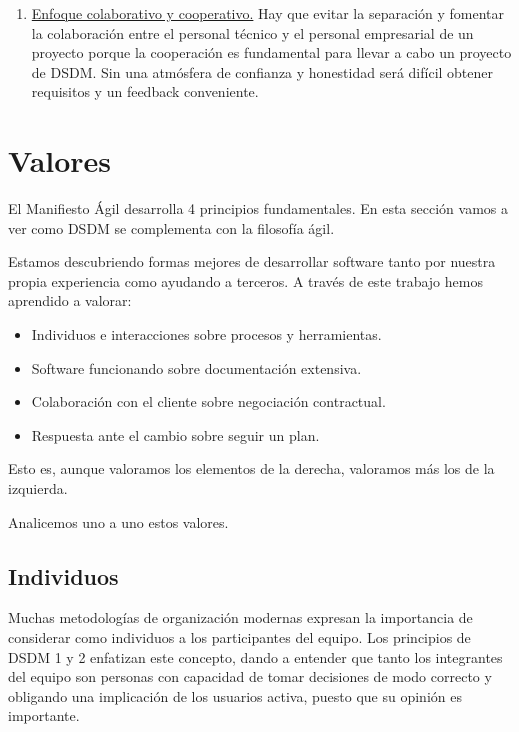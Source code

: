 \documentclass[12pt,a4paper]{article}
\begin{document}
\begin{enumerate}
\item \underline{Enfoque colaborativo y cooperativo.} Hay que evitar la separación y fomentar la colaboración entre el personal técnico y el personal empresarial
de un proyecto porque la cooperación es fundamental para llevar a cabo un proyecto de DSDM. Sin una atmósfera de confianza y honestidad será difícil obtener requisitos y un feedback conveniente.
\end{enumerate}

\section{Valores}

El Manifiesto Ágil desarrolla 4 principios fundamentales. En esta sección vamos a ver como DSDM se complementa con la filosofía ágil.

\begin{myboxii}

Estamos descubriendo formas mejores de desarrollar software tanto por nuestra propia experiencia como ayudando a terceros. A través de este trabajo hemos aprendido a valorar:

    \begin{itemize}
    \item Individuos e interacciones sobre procesos y herramientas.
    \item Software funcionando sobre documentación extensiva.
    \item Colaboración con el cliente sobre negociación contractual.
    \item Respuesta ante el cambio sobre seguir un plan.
    \end{itemize}

Esto es, aunque valoramos los elementos de la derecha, valoramos más los de la izquierda.
\end{myboxii}

Analicemos uno a uno estos valores.

\subsection{Individuos}

Muchas metodologías de organización modernas expresan la importancia de considerar como individuos a los participantes del equipo. Los principios de DSDM 1 y 2 enfatizan este concepto, dando  a entender que tanto los integrantes del equipo son personas con capacidad de tomar decisiones de modo correcto y obligando una implicación de los usuarios activa, puesto que su opinión es importante.
\end{document}
